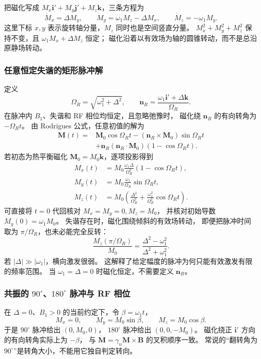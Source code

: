 \documentclass[UTF8,zihao=-4,fontset=fandol,a4paper]{ctexart}
\newcommand{\vect}[1]{\bm{#1}}
\begin{document}
把磁化写成 $M_x\vect i'+M_y\vect j'+M_z\vect k$，三条方程为
\[
\dot M_x=\Delta M_y,\qquad
\dot M_y=\omega_1M_z-\Delta M_x,\qquad
\dot M_z=-\omega_1M_y.
\]
这里下标 $x,y$ 表示旋转轴分量，$M_z$ 同时也是空间竖直分量。
$M_x^2+M_y^2+M_z^2$ 保持不变，且
$\omega_1M_x+\Delta M_z$ 恒定；
磁化沿着以有效场为轴的圆锥转动，而不是总沿原静场转动。

\subsubsection*{任意恒定失谐的矩形脉冲解}
定义
\[
\Omega_R=\sqrt{\omega_1^2+\Delta^2},\qquad
\vect n_R=\frac{\omega_1\vect i'+\Delta\vect k}{\Omega_R}.
\]
在脉冲内 $B_1$、失谐和 RF 相位均恒定，且忽略弛豫时，
磁化绕 $\vect n_R$ 的有向转角为 $-\Omega_Rt$。
由 Rodrigues 公式，任意初值的解为
\[
\begin{aligned}
\vect M(t)={}&\vect M_0\cos\Omega_Rt
-(\vect n_R\times\vect M_0)\sin\Omega_Rt\\
&+\vect n_R(\vect n_R\cdot\vect M_0)(1-\cos\Omega_Rt).
\end{aligned}
\]
若初态为热平衡磁化 $\vect M_0=M_0\vect k$，逐项投影得到
\[
\begin{aligned}
M_x(t)&=M_0\frac{\omega_1\Delta}{\Omega_R^2}(1-\cos\Omega_Rt),\\
M_y(t)&=M_0\frac{\omega_1}{\Omega_R}\sin\Omega_Rt,\\
M_z(t)&=M_0\left(\frac{\Delta^2}{\Omega_R^2}
+\frac{\omega_1^2}{\Omega_R^2}\cos\Omega_Rt\right).
\end{aligned}
\]
可直接将 $t=0$ 代回核对 $M_x=M_y=0,M_z=M_0$，
并核对初始导数 $\dot M_y(0)=\omega_1M_0$。
失谐存在时，磁化围绕倾斜的有效场转动，
即便把脉冲时间取为 $\pi/\Omega_R$，也未必能完全反转：
\[
\frac{M_z(\pi/\Omega_R)}{M_0}
=\frac{\Delta^2-\omega_1^2}{\Delta^2+\omega_1^2}.
\]
若 $|\Delta|\gg|\omega_1|$，横向激发很弱。
这解释了给定幅度的脉冲为何只能有效激发有限的频率范围。
当 $\omega_1=\Delta=0$ 时磁化恒定，不需要定义 $\vect n_R$。

\subsubsection*{共振的 $90^\circ$、$180^\circ$ 脉冲与 RF 相位}
在 $\Delta=0$、$B_1>0$ 的当前约定下，令 $\beta=\omega_1t$，
\[
M_x=0,\qquad M_y=M_0\sin\beta,\qquad M_z=M_0\cos\beta.
\]
于是 $90^\circ$ 脉冲给出 $(0,M_0,0)$，
$180^\circ$ 脉冲给出 $(0,0,-M_0)$。
磁化绕正 $\vect i'$ 方向的有向转角实际上为 $-\beta$，
与 $\dot{\vect M}=\gamma_n\vect M\times\vect B$ 的叉积顺序一致。
常说的“翻转角为 $90^\circ$”是转角大小，不能用它独自判定转向。
\end{document}

